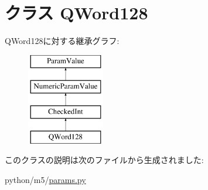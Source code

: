 \hypertarget{classm5_1_1params_1_1QWord128}{
\section{クラス QWord128}
\label{classm5_1_1params_1_1QWord128}
}
QWord128に対する継承グラフ:\begin{figure}[H]
\begin{center}
\leavevmode
\includegraphics[height=4cm]{classm5_1_1params_1_1QWord128}
\end{center}
\end{figure}


このクラスの説明は次のファイルから生成されました:\begin{DoxyCompactItemize}
\item 
python/m5/\hyperlink{params_8py}{params.py}\end{DoxyCompactItemize}
